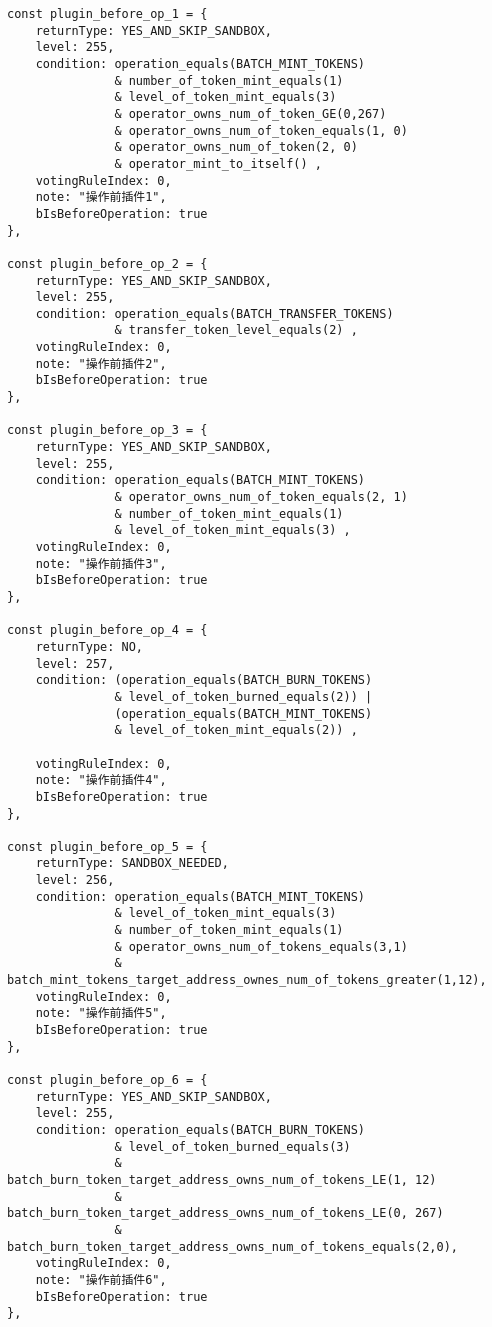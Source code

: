 \documentclass[main.tex]{subfiles}
\begin{document}
\begin{verbatim}
const plugin_before_op_1 = {
    returnType: YES_AND_SKIP_SANDBOX,
    level: 255, 
    condition: operation_equals(BATCH_MINT_TOKENS)
               & number_of_token_mint_equals(1) 
               & level_of_token_mint_equals(3) 
               & operator_owns_num_of_token_GE(0,267) 
               & operator_owns_num_of_token_equals(1, 0)
               & operator_owns_num_of_token(2, 0)
               & operator_mint_to_itself() ,
    votingRuleIndex: 0, 
    note: "操作前插件1",
    bIsBeforeOperation: true  
},

const plugin_before_op_2 = {
    returnType: YES_AND_SKIP_SANDBOX,
    level: 255, 
    condition: operation_equals(BATCH_TRANSFER_TOKENS)
               & transfer_token_level_equals(2) ,
    votingRuleIndex: 0, 
    note: "操作前插件2",
    bIsBeforeOperation: true  
},

const plugin_before_op_3 = {
    returnType: YES_AND_SKIP_SANDBOX,
    level: 255, 
    condition: operation_equals(BATCH_MINT_TOKENS)
               & operator_owns_num_of_token_equals(2, 1)
               & number_of_token_mint_equals(1) 
               & level_of_token_mint_equals(3) ,
    votingRuleIndex: 0, 
    note: "操作前插件3",
    bIsBeforeOperation: true  
},

const plugin_before_op_4 = {
    returnType: NO,
    level: 257, 
    condition: (operation_equals(BATCH_BURN_TOKENS)
               & level_of_token_burned_equals(2)) |
               (operation_equals(BATCH_MINT_TOKENS)
               & level_of_token_mint_equals(2)) ,

    votingRuleIndex: 0, 
    note: "操作前插件4",
    bIsBeforeOperation: true  
},

const plugin_before_op_5 = {
    returnType: SANDBOX_NEEDED,
    level: 256, 
    condition: operation_equals(BATCH_MINT_TOKENS)
               & level_of_token_mint_equals(3)
               & number_of_token_mint_equals(1)
               & operator_owns_num_of_tokens_equals(3,1)
               & batch_mint_tokens_target_address_ownes_num_of_tokens_greater(1,12),
    votingRuleIndex: 0, 
    note: "操作前插件5",
    bIsBeforeOperation: true  
},

const plugin_before_op_6 = {
    returnType: YES_AND_SKIP_SANDBOX,
    level: 255, 
    condition: operation_equals(BATCH_BURN_TOKENS)
               & level_of_token_burned_equals(3)
               & batch_burn_token_target_address_owns_num_of_tokens_LE(1, 12)
               & batch_burn_token_target_address_owns_num_of_tokens_LE(0, 267)
               & batch_burn_token_target_address_owns_num_of_tokens_equals(2,0),
    votingRuleIndex: 0, 
    note: "操作前插件6",
    bIsBeforeOperation: true  
},


\end{verbatim}
\end{document}
